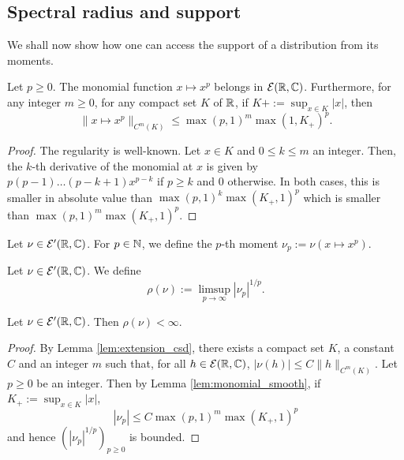 \subsection{Spectral radius and support}

We shall now show how one can access the support of a distribution
from its moments.

\begin{lemma}
  \label{lem:monomial_smooth}
  Let $p \geq 0$.
  The monomial function $x \mapsto x^p$ belongs in $\mathcal{E}(\mathbb{R}, \mathbb{C})$. Furthermore,
  for any integer $m \geq 0$, for any compact set $K$ of $\mathbb{R}$,
  if $K+ := \sup_{x \in K} |x|$, then
  \begin{equation*}
    \|x \mapsto x^p\|_{C^m(K)}
    \leq \max(p,1)^m \max (1, K_+)^p.
  \end{equation*}
\end{lemma}

\begin{proof}
  The regularity is well-known.
  Let $x \in K$ and $0 \leq k \leq m$ an integer.
  Then,
  the $k$-th derivative of the monomial at $x$ is given by
  $p(p-1) \ldots (p-k+1) x^{p-k}$ if $p\geq k$ and $0$ otherwise.
  In both cases,
  this is smaller in absolute value
  than $\max (p,1)^k \max(K_+,1)^p$ which is smaller than $\max(p,1)^m \max(K_+,1)^p$.
\end{proof}

\begin{definition}
  \label{def:moment}
  Let $\nu \in \mathcal{E}'(\mathbb{R}, \mathbb{C})$.
  For $p \in \mathbb{N}$, we define the $p$-th moment $\nu_p := \nu(x \mapsto x^p)$.
\end{definition}

\begin{definition}
  \label{def:radius_csd}
  Let $\nu \in \mathcal{E}'(\mathbb{R}, \mathbb{C})$.
  We define $$\rho(\nu) := \limsup_{p \to \infty} |\nu_p|^{1/p} .$$
\end{definition}

\begin{lemma}
  \label{lem:radius_finite}
  Let $\nu \in \mathcal{E}'(\mathbb{R}, \mathbb{C})$.
  Then $\rho(\nu) < \infty$.
\end{lemma}

\begin{proof}
  By Lemma \ref{lem:extension_csd}, there exists a compact set $K$,
  a constant $C$ and an integer $m$
  such that, for all $h \in \mathcal{E}(\mathbb{R}, \mathbb{C})$,
  $|\nu(h)| \leq C \|h\|_{C^m(K)}$.
Let $p \geq 0$ be an integer.
Then by Lemma \ref{lem:monomial_smooth}, if $K_+ := \sup_{x \in K} |x|$,
$$|\nu_p| \leq C \max(p,1)^m \max (K_+,1)^p$$
and hence $(|\nu_p|^{1/p})_{p \geq 0}$ is bounded.
\end{proof}

